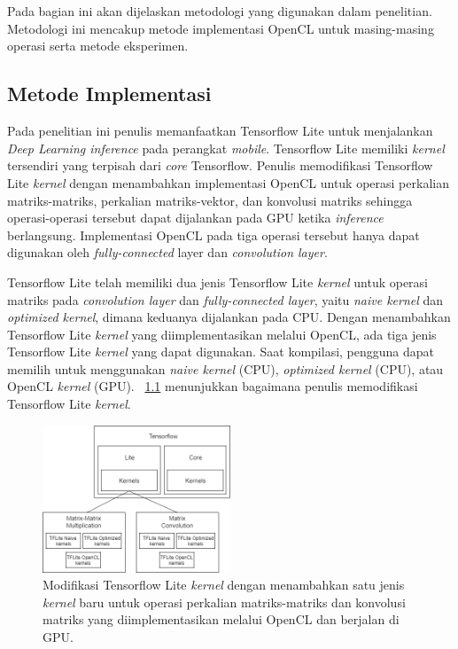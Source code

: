 \chapter{\babTiga}
Pada bagian ini akan dijelaskan metodologi yang digunakan dalam penelitian. Metodologi ini mencakup metode implementasi OpenCL untuk masing-masing operasi serta metode eksperimen.

\section{Metode Implementasi }
Pada penelitian ini penulis memanfaatkan Tensorflow Lite untuk menjalankan \textit{Deep Learning inference} pada perangkat \textit{mobile}. Tensorflow Lite memiliki \textit{kernel} tersendiri yang terpisah dari \textit{core} Tensorflow.  Penulis memodifikasi Tensorflow Lite \textit{kernel} dengan menambahkan implementasi OpenCL untuk operasi perkalian matriks-matriks, perkalian matriks-vektor, dan konvolusi matriks sehingga operasi-operasi tersebut dapat dijalankan pada GPU ketika \textit{inference} berlangsung. Implementasi OpenCL pada tiga operasi tersebut hanya dapat digunakan oleh \textit{fully-connected} layer dan \textit{convolution layer}.

Tensorflow Lite telah memiliki dua jenis Tensorflow Lite \textit{kernel} untuk operasi matriks pada \textit{convolution layer} dan \textit{fully-connected layer}, yaitu \textit{naive kernel} dan \textit{optimized kernel}, dimana keduanya dijalankan pada CPU. Dengan menambahkan Tensorflow Lite \textit{kernel} yang diimplementasikan melalui OpenCL, ada tiga jenis Tensorflow Lite \textit{kernel} yang dapat digunakan. Saat kompilasi, pengguna dapat memilih untuk menggunakan \textit{naive kernel} (CPU), \textit{optimized kernel} (CPU), atau OpenCL \textit{kernel} (GPU). \pic~\ref{fig:modifieddiagram} menunjukkan bagaimana penulis memodifikasi Tensorflow Lite \textit{kernel}.

\begin{figure}
	\centering
	\includegraphics[width=0.50\textwidth]
	{pics/modifieddiagram.png}
	\caption{Modifikasi Tensorflow Lite \textit{kernel} dengan menambahkan satu jenis \textit{kernel} baru untuk operasi perkalian matriks-matriks dan konvolusi matriks yang diimplementasikan melalui OpenCL dan berjalan di GPU.}
	\label{fig:modifieddiagram}
\end{figure}


